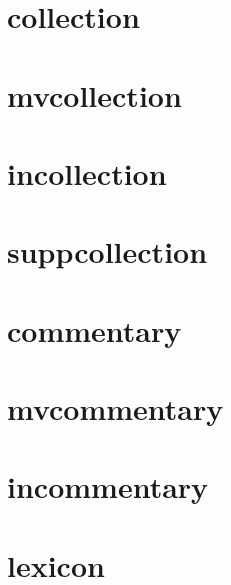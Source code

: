 \documentclass[a4paper]{article}
\begin{document}
\cite[1]{conferencepaper}

\section{collection}

\cite[1]{collection}

\cite[1]{collection}

\section{mvcollection}

\cite[1]{mvcollection}

\cite[1]{mvcollection}

\section{incollection}

\cite[1]{incollection}

\cite[1]{incollection}

\section{suppcollection}

\cite[1]{suppcollection}

\cite[1]{suppcollection}

\section{commentary}

\cite[1]{commentary}

\cite[1]{commentary}

\section{mvcommentary}

\cite[1]{mvcommentary}

\cite[1]{mvcommentary}

\section{incommentary}

\cite[1]{incommentary}

\cite[1]{incommentary}

\section{lexicon}
\end{document}
